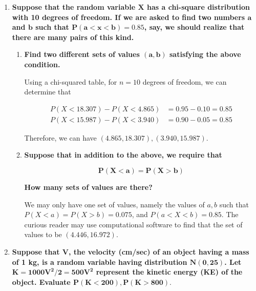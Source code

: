 \documentclass[10pt, oneside]{article}   	%
\theoremstyle{definition}
\begin{document}
\begin{enumerate}[label=9.\arabic*]
\begin{proof}
\end{proof}

\item  \begin{tcolorbox}[
  colback=Cerulean!5!white,
  colframe=Cerulean!75!black]
\textbf{Suppose that the random variable $\bm{X}$ has a chi-square distribution with 10 degrees of freedom. If we are asked to find two numbers $\bm{a}$ and $\bm{b}$ such that $\bm{P(a < x < b) = 0.85}$, say, we should realize that there are many pairs of this kind.}
\end{tcolorbox}

	\begin{enumerate}
	\item  \begin{tcolorbox}[
	  colback=Cerulean!5!white,
	  colframe=Cerulean!75!black]
	\textbf{Find two different sets of values $\bm{(a,b)}$ satisfying the above condition.}
	\end{tcolorbox}
	
	Using a chi-squared table, for $n = 10$ degrees of freedom, we can determine that
	
	\begin{align*}
	P(X < 18.307) - P(X < 4.865) &= 0.95 - 0.10 = 0.85 \\
	P(X < 15.987) - P(X < 3.940) &= 0.90 - 0.05 = 0.85
	\end{align*}
	
	Therefore, we can have $\boxed{ (4.865, 18.307), (3.940, 15.987) }$.
	
	\item  \begin{tcolorbox}[
	  colback=Cerulean!5!white,
	  colframe=Cerulean!75!black]
	\textbf{Suppose that in addition to the above, we require that}
	
	\[ \bm{P(X < a) = P(X > b)} \]
	
	\textbf{How many sets of values are there?}
	\end{tcolorbox}
	
	We may only have $\boxed{\text{one}}$ set of values, namely the values of $a, b$ such that $P(X < a) = P(X > b) = 0.075$, and $P(a < X < b) = 0.85$. The curious reader may use computational software to find that the set of values to be $(4.446, 16.972)$.
	
	\end{enumerate}

\item  \begin{tcolorbox}[
  colback=Cerulean!5!white,
  colframe=Cerulean!75!black]
\textbf{Suppose that $\bm{V}$, the velocity (cm/sec) of an object having a mass of 1 kg, is a random variable having distribution $\bm{N(0, 25)}$. Let $\bm{K = 1000V^2/2 = 500V^2}$ represent the kinetic energy (KE) of the object. Evaluate $\bm{P(K < 200), P(K > 800).}$}
\end{tcolorbox}


\end{enumerate}
\end{document}
